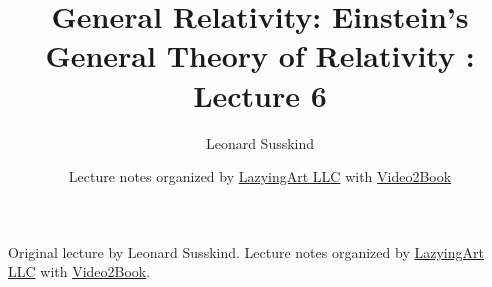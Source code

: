 \documentclass[11pt,oneside]{book}
\begin{document}
\frontmatter
\title{General Relativity: Einstein's General Theory of Relativity : Lecture 6}
\author{Leonard Susskind}
\date{Lecture notes organized by \href{https://lazying.art}{LazyingArt LLC} with \href{https://github.com/lachlanchen/Video2Book}{Video2Book}}
\maketitle
\begin{center}
\small Original lecture by Leonard Susskind. Lecture notes organized by \href{https://lazying.art}{LazyingArt LLC} with \href{https://github.com/lachlanchen/Video2Book}{Video2Book}.
\end{center}
\clearpage
\mainmatter

\end{document}
